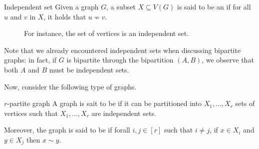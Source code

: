 \documentclass[a4paper, 12pt]{report}
\begin{document}
    \begin{frameddefn}{Independent set}
        Given a graph $G$, a subset $X \subseteq V(G)$ is said to be an  if for all $u$ and $v$ in $X$, it holds that $u \nsim v$.
    \end{frameddefn}

    \begin{figure}[H]
        \centering
        \caption{For instance, the  set of vertices is an independent set.}
    \end{figure}

    Note that we already encountered independent sets when discussing bipartite graphs: in fact, if $G$ is bipartite through the bipartition $(A, B)$, we observe that both $A$ and $B$ must be independent sets.

    Now, consider the following type of graphs.

    \begin{frameddefn}{$r$-partite graph}
        A graph is sait to be  if it can be partitioned into $X_1, \ldots, X_r$ sets of vertices such that $X_1, \ldots, X_r$ are independent sets.

        Moreover, the graph is said to be  if forall $i, j \in [r]$ such that $i \neq j$, if $x \in X_i$ and $y \in X_j$ then $x \sim y$.
    \end{frameddefn}
\end{document}
